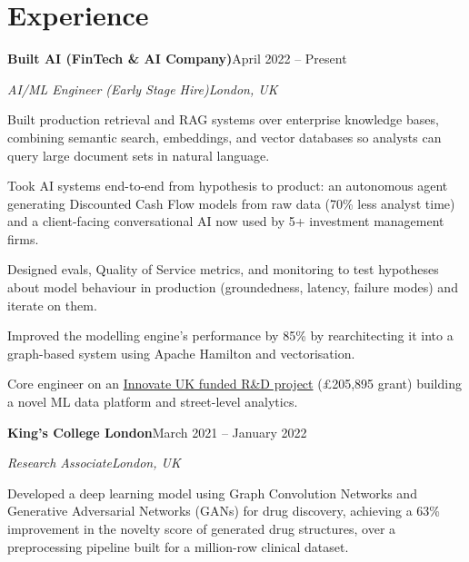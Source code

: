 \documentclass[10pt,a4paper]{article}
\newcommand{\entry}[4]{%
  {\color{company}\bfseries #1}\hfill {\color{muted}#2}\par
  \vspace{1pt}
  {\itshape #3}\hfill {\color{muted}\itshape #4}\par
  \vspace{3pt}%
}
\begin{document}
\section{Experience}
\entry{Built AI (FinTech \& AI Company)}{April 2022 -- Present}{AI/ML Engineer (Early Stage Hire)}{London, UK}
\begin{tight}
  \item Built production retrieval and RAG systems over enterprise knowledge bases, combining semantic search, embeddings, and vector databases so analysts can query large document sets in natural language.
  \item Took AI systems end-to-end from hypothesis to product: an autonomous agent generating Discounted Cash Flow models from raw data (70\% less analyst time) and a client-facing conversational AI now used by 5+ investment management firms.
  \item Designed evals, Quality of Service metrics, and monitoring to test hypotheses about model behaviour in production (groundedness, latency, failure modes) and iterate on them.
  \item Improved the modelling engine's performance by 85\% by rearchitecting it into a graph-based system using Apache Hamilton and vectorisation.
  \item Core engineer on an \href{https://gtr.ukri.org/projects?ref=10022996}{Innovate UK funded R\&D project} (\pounds205,895 grant) building a novel ML data platform and street-level analytics.
\end{tight}

\entry{King's College London}{March 2021 -- January 2022}{Research Associate}{London, UK}
\begin{tight}
  \item Developed a deep learning model using Graph Convolution Networks and Generative Adversarial Networks (GANs) for drug discovery, achieving a 63\% improvement in the novelty score of generated drug structures, over a preprocessing pipeline built for a million-row clinical dataset.
\end{tight}

\end{document}
